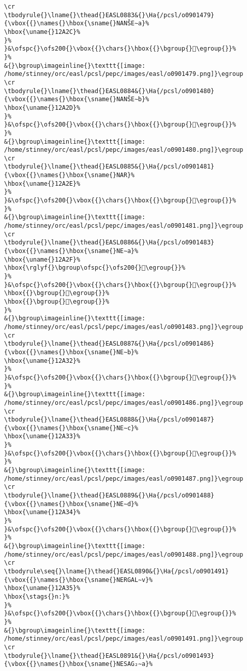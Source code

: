\begin{verbatim}
\cr
\tbodyrule{}\lname{}\thead{}EASL0883&{}\Ha{/pcsl/o0901479}{\vbox{{}\names{}\hbox{\sname{}NANŠE∼a}%
\hbox{\uname{}12A2C}%
}%
}&\ofspc{}\ofs200{}\vbox{{}\chars{}\hbox{{}\bgroup{}𒨬\egroup{}}%
}%
&{}\bgroup\imageinline{}\texttt{[image: /home/stinney/orc/easl/pcsl/pepc/images/easl/o0901479.png]}\egroup
\cr
\tbodyrule{}\lname{}\thead{}EASL0884&{}\Ha{/pcsl/o0901480}{\vbox{{}\names{}\hbox{\sname{}NANŠE∼b}%
\hbox{\uname{}12A2D}%
}%
}&\ofspc{}\ofs200{}\vbox{{}\chars{}\hbox{{}\bgroup{}𒨭\egroup{}}%
}%
&{}\bgroup\imageinline{}\texttt{[image: /home/stinney/orc/easl/pcsl/pepc/images/easl/o0901480.png]}\egroup
\cr
\tbodyrule{}\lname{}\thead{}EASL0885&{}\Ha{/pcsl/o0901481}{\vbox{{}\names{}\hbox{\sname{}NAR}%
\hbox{\uname{}12A2E}%
}%
}&\ofspc{}\ofs200{}\vbox{{}\chars{}\hbox{{}\bgroup{}𒨮\egroup{}}%
}%
&{}\bgroup\imageinline{}\texttt{[image: /home/stinney/orc/easl/pcsl/pepc/images/easl/o0901481.png]}\egroup
\cr
\tbodyrule{}\lname{}\thead{}EASL0886&{}\Ha{/pcsl/o0901483}{\vbox{{}\names{}\hbox{\sname{}NE∼a}%
\hbox{\uname{}12A2F}%
\hbox{\rglyf{}\bgroup\ofspc{}\ofs200{}𒨯\egroup{}}%
}%
}&\ofspc{}\ofs200{}\vbox{{}\chars{}\hbox{{}\bgroup{}𒨯\egroup{}}%
\hbox{{}\bgroup{}𒨰\egroup{}}%
\hbox{{}\bgroup{}𒨱\egroup{}}%
}%
&{}\bgroup\imageinline{}\texttt{[image: /home/stinney/orc/easl/pcsl/pepc/images/easl/o0901483.png]}\egroup
\cr
\tbodyrule{}\lname{}\thead{}EASL0887&{}\Ha{/pcsl/o0901486}{\vbox{{}\names{}\hbox{\sname{}NE∼b}%
\hbox{\uname{}12A32}%
}%
}&\ofspc{}\ofs200{}\vbox{{}\chars{}\hbox{{}\bgroup{}𒨲\egroup{}}%
}%
&{}\bgroup\imageinline{}\texttt{[image: /home/stinney/orc/easl/pcsl/pepc/images/easl/o0901486.png]}\egroup
\cr
\tbodyrule{}\lname{}\thead{}EASL0888&{}\Ha{/pcsl/o0901487}{\vbox{{}\names{}\hbox{\sname{}NE∼c}%
\hbox{\uname{}12A33}%
}%
}&\ofspc{}\ofs200{}\vbox{{}\chars{}\hbox{{}\bgroup{}𒨳\egroup{}}%
}%
&{}\bgroup\imageinline{}\texttt{[image: /home/stinney/orc/easl/pcsl/pepc/images/easl/o0901487.png]}\egroup
\cr
\tbodyrule{}\lname{}\thead{}EASL0889&{}\Ha{/pcsl/o0901488}{\vbox{{}\names{}\hbox{\sname{}NE∼d}%
\hbox{\uname{}12A34}%
}%
}&\ofspc{}\ofs200{}\vbox{{}\chars{}\hbox{{}\bgroup{}𒨴\egroup{}}%
}%
&{}\bgroup\imageinline{}\texttt{[image: /home/stinney/orc/easl/pcsl/pepc/images/easl/o0901488.png]}\egroup
\cr
\tbodyrule\seq{}\lname{}\thead{}EASL0890&{}\Ha{/pcsl/o0901491}{\vbox{{}\names{}\hbox{\sname{}NERGAL∼v}%
\hbox{\uname{}12A35}%
\hbox{\stags{}n:}%
}%
}&\ofspc{}\ofs200{}\vbox{{}\chars{}\hbox{{}\bgroup{}𒨵\egroup{}}%
}%
&{}\bgroup\imageinline{}\texttt{[image: /home/stinney/orc/easl/pcsl/pepc/images/easl/o0901491.png]}\egroup
\cr
\tbodyrule{}\lname{}\thead{}EASL0891&{}\Ha{/pcsl/o0901493}{\vbox{{}\names{}\hbox{\sname{}NESAG₂∼a}%

\end{verbatim}
